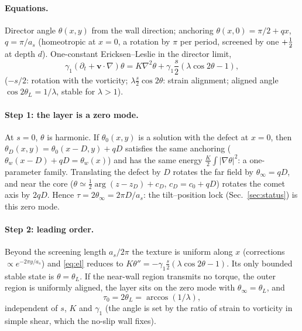 \paragraph{Equations.} Director angle $\theta(x,y)$ from the wall direction; anchoring $\theta(x,0)=\pi/2+qx$, $q=\pi/a_s$ (homeotropic at $x=0$, a rotation by $\pi$ per
period, screened by one $+\tfrac12$ at depth $d$). One-constant Ericksen--Leslie in the director limit,
\begin{equation}
\gamma_1(\partial_t+\mathbf v\cdot\nabla)\theta = K\nabla^2\theta+\gamma_1\frac{s}{2}\left(\lambda\cos2\theta-1\right),\label{eq:el}
\end{equation}
($-s/2$: rotation with the vorticity; $\lambda\frac s2\cos2\theta$: strain alignment; aligned angle $\cos2\theta_L=1/\lambda$, stable for $\lambda>1$).
\paragraph{Step 1: the layer is a zero mode.} At $s=0$, $\theta$ is harmonic. If $\theta_0(x,y)$ is a solution with the defect at $x=0$, then
$\theta_D(x,y)=\theta_0(x-D,y)+qD$ satisfies the same anchoring ($\theta_w(x-D)+qD=\theta_w(x)$) and has the same energy $\frac K2\int|\nabla\theta|^2$: a one-parameter
family. Translating the defect by $D$ rotates the far field by $\theta_\infty=qD$, and near the core ($\theta\simeq\frac12\arg(z-z_D)+c_D$, $c_D=c_0+qD$) rotates the comet axis
by $2qD$. Hence $\tau=2\theta_\infty=2\pi D/a_s$: the tilt--position lock (Sec.~\ref{sec:status}) is this zero mode.
\paragraph{Step 2: leading order.} Beyond the screening length $a_s/2\pi$ the texture is uniform along $x$ (corrections $\propto e^{-2\pi y/a_s}$) and \eqref{eq:el} reduces
to $K\theta''=-\gamma_1\frac s2(\lambda\cos2\theta-1)$. Its only bounded stable state is $\theta=\theta_L$. If the near-wall region transmits no torque, the outer
region is uniformly aligned, the layer sits on the zero mode with $\theta_\infty=\theta_L$, and
\begin{equation}
\tau_0=2\theta_L=\arccos(1/\lambda),
\end{equation}
independent of $s$, $K$ and $\gamma_1$ (the angle is set by the ratio of strain to vorticity in simple shear, which the no-slip wall fixes).
